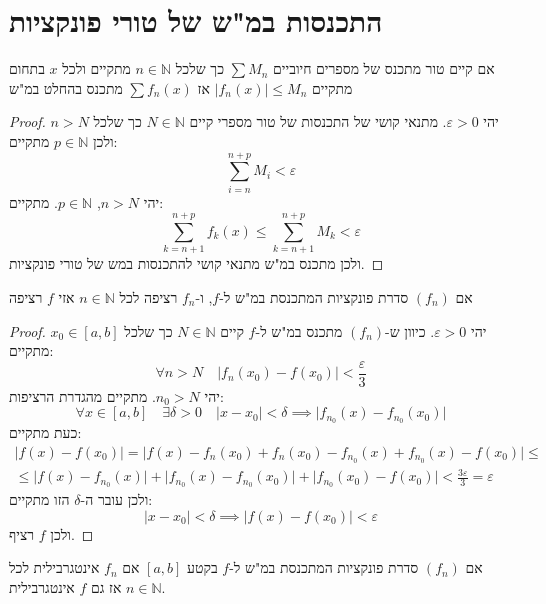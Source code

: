 \documentclass{tstextbook}
\begin{document}
\section{התכנסות במ"ש של טורי פונקציות}

\begin{proposition}
אם קיים טור מתכנס של מספרים חיוביים \(\sum M_n\) כך שלכל \(n\in \mathbb N\) מתקיים ולכל \(x\) בתחום מתקיים \(|f_n(x)|\leq M_n\) אז \(\sum f_n(x)\) מתכנס בהחלט במ"ש

\end{proposition}
\begin{proof}
יהי \(\varepsilon>0\). מתנאי קושי של התכנסות של טור מספרי קיים \(N \in \mathbb{N}\) כך שלכל \(n > N\) ולכן \(p \in \mathbb{N}\) מתקיים:
$$\sum_{i=n}^{n+p} M_{i}<\varepsilon$$
יהי \(n>N\), \(p \in \mathbb{N}\). מתקיים:
$$\sum_{k=n+1}^{n+p}f_{k}(x)\leq \sum_{k=n+1}^{n+p} M_{k}<\varepsilon$$
ולכן מתכנס במ"ש מתנאי קושי להתכנסות במש של טורי פונקציות.

\end{proof}
\begin{proposition}
אם \((f_{n})\) סדרת פונקציות המתכנסת במ"ש ל-\(f\), ו-\(f_{n}\) רציפה לכל \(n\in \mathbb{N}\) אזי \(f\) רציפה

\end{proposition}
\begin{proof}
יהי \(\varepsilon>0\). כיוון ש-\((f_{n})\) מתכנס במ"ש ל-\(f\) קיים \(N \in \mathbb{N}\) כך שלכל \(x_{0} \in [a,b]\) מתקיים:
$$\forall n > N\quad \lvert f_{n}(x_{0})-f(x_{0}) \rvert <\frac{\varepsilon}{3}$$
יהי \(n_{0}>N\). מתקיים מהגדרת הרציפות:
$$\forall x \in [a,b]\quad \exists \delta> 0\quad \lvert x-x_{0} \rvert <\delta\implies \lvert f_{n_{0}}(x)-f_{n_{0}}(x_{0}) \rvert $$
כעת מתקיים:
\begin{gather*}\lvert f(x)-f(x_{0}) \rvert =\lvert f(x)-f_{n}(x_{0})+f_{n}(x_{0})-f_{n_{0}}(x)+f_{n_{0}}(x)-f(x_{0}) \rvert \leq \\\leq \lvert f(x)-f_{n_{0}}(x) \rvert +\lvert f_{n_{0}}(x)-f_{n_{0}}(x_{0}) \rvert +\lvert f_{n_{0}}(x_{0})-f(x_{0}) \rvert <\frac{3\varepsilon}{3}=\varepsilon 
\end{gather*}
ולכן עובר ה-\(\delta\) הזו מתקיים:
$$\lvert x-x_{0} \rvert <\delta\implies \lvert f(x)-f(x_{0}) \rvert <\varepsilon$$
ולכן \(f\) רציף.

\end{proof}
\begin{proposition}
אם \((f_{n})\) סדרת פונקציות המתכנסת במ"ש ל-\(f\) בקטע \([a,b]\) אם \(f_{n}\) אינטגרבילית לכל \(n \in \mathbb{N}\) אז גם \(f\) אינטגרבילית.

\end{proposition}
\end{document}
